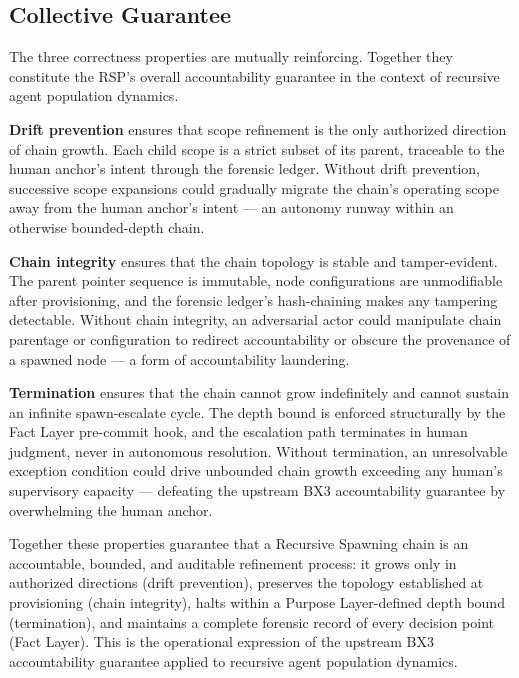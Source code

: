 \subsection{Collective Guarantee}
\label{sec:rs-collective-guarantee}

The three correctness properties are mutually reinforcing. Together they constitute the RSP's overall accountability guarantee in the context of recursive agent population dynamics.

\medskip
\textbf{Drift prevention} ensures that scope refinement is the only authorized direction of chain growth. Each child scope is a strict subset of its parent, traceable to the human anchor's intent through the forensic ledger. Without drift prevention, successive scope expansions could gradually migrate the chain's operating scope away from the human anchor's intent — an autonomy runway within an otherwise bounded-depth chain.

\medskip
\textbf{Chain integrity} ensures that the chain topology is stable and tamper-evident. The parent pointer sequence is immutable, node configurations are unmodifiable after provisioning, and the forensic ledger's hash-chaining makes any tampering detectable. Without chain integrity, an adversarial actor could manipulate chain parentage or configuration to redirect accountability or obscure the provenance of a spawned node — a form of accountability laundering.

\medskip
\textbf{Termination} ensures that the chain cannot grow indefinitely and cannot sustain an infinite spawn-escalate cycle. The depth bound is enforced structurally by the Fact Layer pre-commit hook, and the escalation path terminates in human judgment, never in autonomous resolution. Without termination, an unresolvable exception condition could drive unbounded chain growth exceeding any human's supervisory capacity — defeating the upstream BX3 accountability guarantee by overwhelming the human anchor.

Together these properties guarantee that a Recursive Spawning chain is an accountable, bounded, and auditable refinement process: it grows only in authorized directions (drift prevention), preserves the topology established at provisioning (chain integrity), halts within a Purpose Layer-defined depth bound (termination), and maintains a complete forensic record of every decision point (Fact Layer). This is the operational expression of the upstream BX3 accountability guarantee applied to recursive agent population dynamics.
